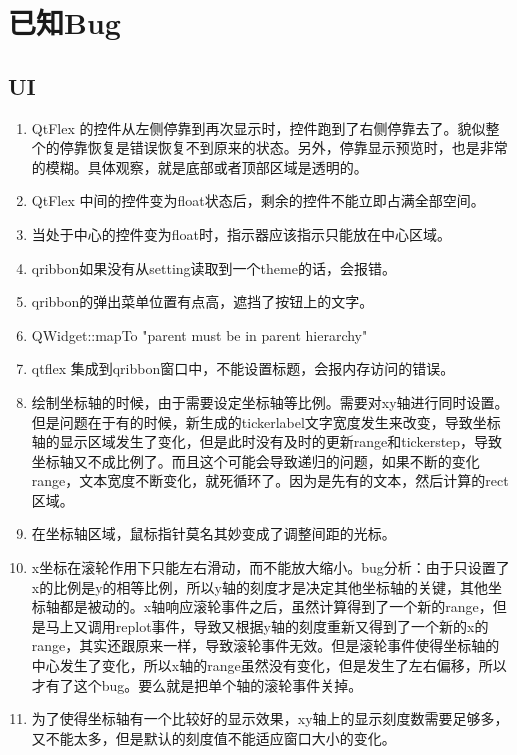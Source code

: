 \section{已知Bug}

\subsection{UI}

\begin{enumerate}
	\item QtFlex 的控件从左侧停靠到再次显示时，控件跑到了右侧停靠去了。貌似整个的停靠恢复是错误恢复不到原来的状态。另外，停靠显示预览时，也是非常的模糊。具体观察，就是底部或者顶部区域是透明的。
	\item QtFlex 中间的控件变为float状态后，剩余的控件不能立即占满全部空间。
	\item 当处于中心的控件变为float时，指示器应该指示只能放在中心区域。
	
	\item qribbon如果没有从setting读取到一个theme的话，会报错。
	
	\item qribbon的弹出菜单位置有点高，遮挡了按钮上的文字。
	
	\item QWidget::mapTo "parent must be in parent hierarchy"
	
	\item qtflex 集成到qribbon窗口中，不能设置标题，会报内存访问的错误。
	
	\item 绘制坐标轴的时候，由于需要设定坐标轴等比例。需要对xy轴进行同时设置。但是问题在于有的时候，新生成的tickerlabel文字宽度发生来改变，导致坐标轴的显示区域发生了变化，但是此时没有及时的更新range和tickerstep，导致坐标轴又不成比例了。而且这个可能会导致递归的问题，如果不断的变化range，文本宽度不断变化，就死循环了。因为是先有的文本，然后计算的rect区域。
	
	\item 在坐标轴区域，鼠标指针莫名其妙变成了调整间距的光标。
	
	\item x坐标在滚轮作用下只能左右滑动，而不能放大缩小。bug分析：由于只设置了x的比例是y的相等比例，所以y轴的刻度才是决定其他坐标轴的关键，其他坐标轴都是被动的。x轴响应滚轮事件之后，虽然计算得到了一个新的range，但是马上又调用replot事件，导致又根据y轴的刻度重新又得到了一个新的x的range，其实还跟原来一样，导致滚轮事件无效。但是滚轮事件使得坐标轴的中心发生了变化，所以x轴的range虽然没有变化，但是发生了左右偏移，所以才有了这个bug。要么就是把单个轴的滚轮事件关掉。
	
	\item 为了使得坐标轴有一个比较好的显示效果，xy轴上的显示刻度数需要足够多，又不能太多，但是默认的刻度值不能适应窗口大小的变化。
\end{enumerate}